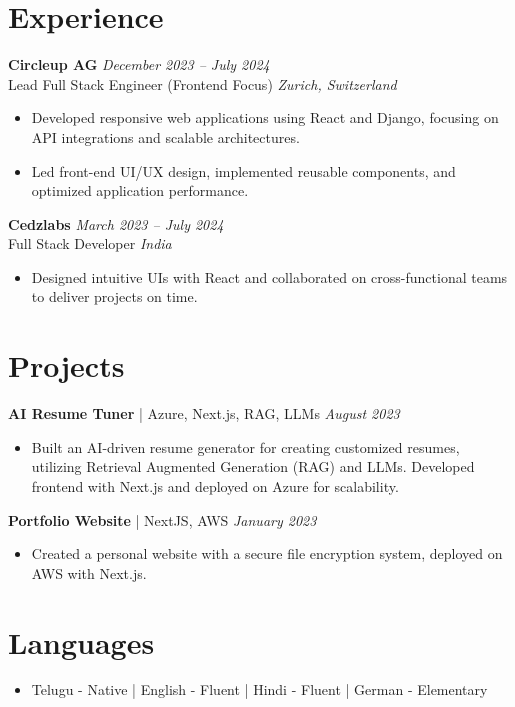 \documentclass[letterpaper,11pt]{article}
\begin{document}
\section{Experience}

\textbf{Circleup AG} \hfill \textit{December 2023 -- July 2024} \\
Lead Full Stack Engineer (Frontend Focus) \hfill \textit{Zurich, Switzerland}
\begin{itemize}
    \item Developed responsive web applications using React and Django, focusing on API integrations and scalable architectures.
    \item Led front-end UI/UX design, implemented reusable components, and optimized application performance.
\end{itemize}

\textbf{Cedzlabs} \hfill \textit{March 2023 -- July 2024} \\
Full Stack Developer \hfill \textit{India}
\begin{itemize}
    \item Designed intuitive UIs with React and collaborated on cross-functional teams to deliver projects on time.
\end{itemize}

\section{Projects}
\textbf{AI Resume Tuner} | Azure, Next.js, RAG, LLMs \hfill \textit{August 2023}\\
\begin{itemize}
    \item Built an AI-driven resume generator for creating customized resumes, utilizing Retrieval Augmented Generation (RAG) and LLMs. Developed frontend with Next.js and deployed on Azure for scalability.
\end{itemize}

\textbf{Portfolio Website} | NextJS, AWS \hfill \textit{January 2023}\\
\begin{itemize}
    \item Created a personal website with a secure file encryption system, deployed on AWS with Next.js.
\end{itemize}

\section{Languages}
\begin{itemize}
  \item Telugu - Native | English - Fluent | Hindi - Fluent | German - Elementary
\end{itemize}
\end{document}
